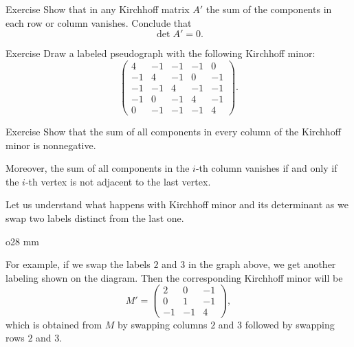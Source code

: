 \begin{thm}{Exercise}\label{ex:Kirchhoff-row}
Show that in any Kirchhoff matrix $A'$ the sum of the components in each row or column vanishes.
Conclude that 
\[\det A'=0.\]

\end{thm}

\begin{thm}{Exercise}\label{ex:minor>graph}
Draw a labeled pseudograph with the following Kirchhoff minor:
\[\left(
\begin{matrix}
4&-1&-1&-1&0
\\
-1&4&-1&0&-1
\\
-1&-1&4&-1&-1
\\
-1&0&-1&4&-1
\\
0&-1&-1&-1&4
\end{matrix}
\right).\]
\end{thm}

\begin{thm}{Exercise}\label{ex:sum-kirchhoff}
Show that the sum of all components in every column of the Kirchhoff minor is nonnegative.

Moreover, the sum of all components in the $i$-th column vanishes if and only if the $i$-th vertex is not adjacent to the last vertex.
\end{thm}



Let us understand what happens with Kirchhoff minor and its determinant as we swap two labels distinct from the last one.

\begin{wrapfigure}[6]{o}{28 mm}
\end{wrapfigure}

For example, if we swap the labels $2$ and $3$ in the graph above,
we get another labeling shown on the diagram.
Then the corresponding Kirchhoff minor will be 
\[
M'=\left(
\begin{matrix}
2&0&-1
\\
0&1&-1
\\
-1&-1&4
\end{matrix}
\right),
\]
which is obtained from $M$ by swapping columns $2$ and $3$ followed by swapping rows $2$ and $3$.

